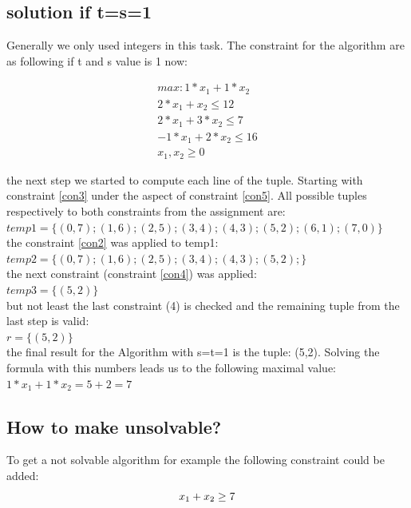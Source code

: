 \documentclass[%
   10pt,              %
   nenglish,           %
   a4paper,           %
   DIV11,             %
]{scrartcl}%
\begin{document}
\subsection*{solution if t=s=1}
Generally we only used integers in this task. The constraint for the algorithm are as following if t and s value is 1 now:

\begin{eqnarray}
max: 1*x_1+1*x_2 \label{con1}\\ 
2*x_1+x_2 \le 12 \label{con2}\\ 
2*x_1+3*x_2 \le 7 \label{con3}\\ 
-1*x_1+2*x_2 \le 16 \label{con4}\\ 
x_1,x_2 \ge 0 \label{con5}
\end{eqnarray}

\noindent the next step we started to compute each line of the tuple. Starting with constraint \ref{con3} under the aspect of constraint \ref{con5}. All possible tuples respectively to both constraints from the assignment are:\\
$temp1=\{(0,7);(1,6);(2,5);(3,4);(4,3);(5,2);(6,1);(7,0)\}$\\

\noindent the constraint \ref{con2} was applied to temp1:\\
$temp2=\{(0,7);(1,6);(2,5);(3,4);(4,3);(5,2);\}$\\

\noindent the next constraint (constraint \ref{con4}) was applied:\\
$temp3=\{(5,2)\}$\\

\noindent but not least the last constraint (4) is checked and the remaining tuple from the last step is valid:\\
$r=\{(5,2)\}$\\

\noindent the final result for the Algorithm with s=t=1 is the tuple: (5,2). Solving the formula with this numbers 
leads us to the following maximal value: $1*x_1 + 1*x_2 = 5+2 = 7$\\


\subsection*{How to make unsolvable?}
To get a not solvable algorithm for example the following constraint could be added:
	\begin{equation}\\
		x_1+x_2\ge 7
	\end{equation}
\end{document}
